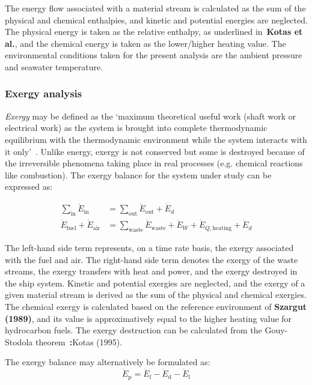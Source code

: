\documentclass[preprint,12pt]{elsarticle}
\begin{document}
The energy flow associated with a material stream is calculated as the sum of the physical and chemical enthalpies, and kinetic and potential energies are neglected.    The physical energy is taken as the relative enthalpy, as underlined in~\textbf{Kotas et al.}, and the chemical energy is taken as the lower/higher heating value. The environmental conditions taken for the present analysis are the ambient pressure and seawater temperature.

\subsubsection{Exergy analysis}

\emph{Exergy} may be defined as the `maximum theoretical useful work (shaft work or electrical work) as the system is brought into complete thermodynamic equilibrium with the thermodynamic environment while the system interacts with it only'~\citep{Moran1989}. Unlike energy, exergy is not conserved but some is destroyed because of the irreversible phenomena taking place in real processes (e.g. chemical reactions like combustion). The exergy balance for the system under study can be expressed as:

\begin{align}
	\sum_{\mathrm{in}} \dot{E}_{\mathrm{in}} &= \sum_{\mathrm{out}} \dot{E}_{\mathrm{out}} +\dot{E}_{d} \\
	\dot{E}_{\mathrm{fuel}} + \dot{E}_{\mathrm{air}} &= \sum_{{\mathrm{waste}}}\dot{E}_{{\mathrm{waste}}}+\dot{E}_{W}+\dot{E}_{Q,\mathrm{heating}}+\dot{E}_{d} 
\end{align}

The left-hand side term represents, on a time rate basis, the exergy associated with the fuel and air. The right-hand side term denotes the exergy of the waste streams, the exergy transfers with heat and power, and the exergy destroyed in the ship system. Kinetic and potential exergies are neglected, and the exergy of a given material stream is derived as the sum of the physical and chemical exergies. The chemical exergy is calculated based on the reference environment of \textbf{Szargut (1989)}, and its value is approximatively equal to the higher heating value for hydrocarbon fuels. The exergy destruction can be calculated from the Gouy-Stodola theorem~\textbf:{Kotas (1995)}.    

The exergy balance may alternatively be formulated as:
\begin{equation}
\dot{E}_{\mathrm{p}} = \dot{E}_{\mathrm{f}} - \dot{E}_{\mathrm{d}} - \dot{E}_{\mathrm{l}} 
\end{equation}
\end{document}
